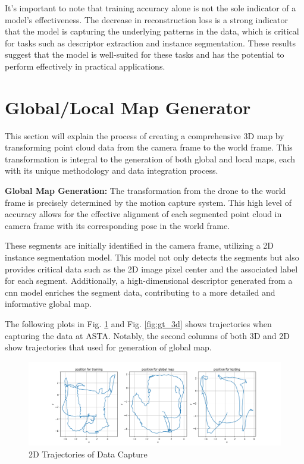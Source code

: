 It's important to note that training accuracy alone is not the sole indicator of a model's effectiveness. The decrease in reconstruction loss is a strong indicator that the model is capturing the underlying patterns in the data, which is critical for tasks such as descriptor extraction and instance segmentation. These results suggest that the model is well-suited for these tasks and has the potential to perform effectively in practical applications.

\section{Global/Local Map Generator}
This section will explain the process of creating a comprehensive 3D map by transforming point cloud data from the camera frame to the world frame. This transformation is integral to the generation of both global and local maps, each with its unique methodology and data integration process.

\textbf{Global Map Generation:} The transformation from the drone to the world frame is precisely determined by the motion capture system. This high level of accuracy allows for the effective alignment of each segmented point cloud in camera frame with its corresponding pose in the world frame. 

These segments are initially identified in the camera frame, utilizing a 2D instance segmentation model. This model not only detects the segments but also provides critical data such as the 2D image pixel center and the associated label for each segment. Additionally, a high-dimensional descriptor generated from a \acrshort{cnn} model enriches the segment data, contributing to a more detailed and informative global map.

The following plots in Fig. \ref{fig:gt_2d} and Fig. \ref{fig:gt_3d} shows trajectories when capturing the data at ASTA. Notably, the second columns of both 3D and 2D show trajectories that used for generation of global map.

\begin{figure}[H]
    \centering
    \includegraphics[width=1\linewidth]{Pictures/mapping/3gt.png}
    \caption{2D Trajectories of Data Capture}
    \label{fig:gt_2d}
\end{figure}

